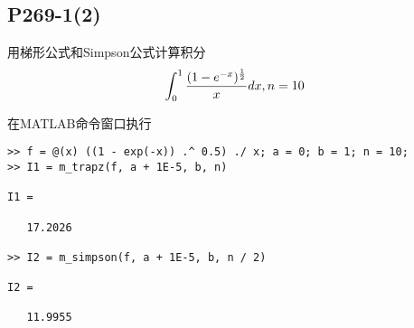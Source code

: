 \subsection{P269-1(2)}
\renewcommand{\FX}{\frac{(1-e^{-x})^{\frac{1}{2}}}{x}}
\renewcommand{\LRANGE}{0}
\renewcommand{\RRANGE}{1}
\renewcommand{\N}{10}

用梯形公式和Simpson公式计算积分
\begin{displaymath}
\INTRANGE{\FX}{x}, n = \N
\end{displaymath}

\begin{SOLVE}
在MATLAB命令窗口执行
\begin{lstlisting}
>> f = @(x) ((1 - exp(-x)) .^ 0.5) ./ x; a = 0; b = 1; n = 10;
>> I1 = m_trapz(f, a + 1E-5, b, n)

I1 =

   17.2026

>> I2 = m_simpson(f, a + 1E-5, b, n / 2)

I2 =

   11.9955

\end{lstlisting}
\end{SOLVE}
